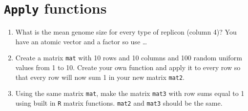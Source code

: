 \documentclass[letterpaper,12pt]{article}
\newcommand{\pl}[1]{\texttt{#1}}
\begin{document}
\section{\pl{Apply} functions}
  \begin{enumerate}
  \item What is the mean genome size for every type of replicon (column 4)? You have an atomic vector and a factor so use \ldots
  \item Create a matrix \pl{mat} with 10 rows and 10 columns and 100 random uniform values from 1 to 10. Create your own function and apply it to every row so that every row will now sum 1 in your new matrix \pl{mat2}.
  \item Using the same matrix \pl{mat}, make the matrix \pl{mat3} with row sums equal to 1 using built in \pl{R} matrix functions. \pl{mat2} and \pl{mat3} should be the same.
  \end{enumerate}
\end{document}
